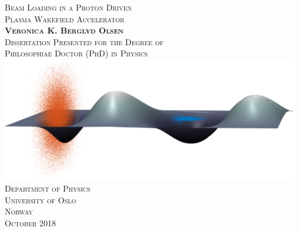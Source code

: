 \begin{titlepage}
    \begin{center}
        \vspace*{10mm}
        \huge
        \scshape
        Beam Loading in a Proton Driven\\
        Plasma Wakefield Accelerator\\
        \vspace{20mm}
        \large
        \upshape
        \textbf{Veronica K. Berglyd Olsen}\\
        \vspace{4mm}
        Dissertation Presented for the Degree of\\
        Philosophiae Doctor (PhD) in Physics\\
        \vspace{30mm}
        \includegraphics[width=0.98\textwidth]{images/3DWakefield.png}\\
        \vspace{20mm}
        Department of Physics\\
        University of Oslo\\
        Norway\\
        \large{October 2018}
    \end{center}
\end{titlepage}
